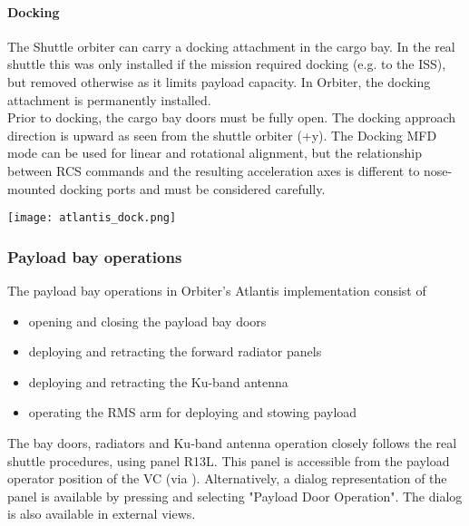 \documentclass[Orbiter User Manual.tex]{subfiles}
\begin{document}
\paragraph{Docking}
The Shuttle orbiter can carry a docking attachment in the cargo bay. In the real shuttle this was only installed if the mission required docking (e.g. to the ISS), but removed otherwise as it limits payload capacity. In Orbiter, the docking attachment is permanently installed.\\

Prior to docking, the cargo bay doors must be fully open. The docking approach direction is upward as seen from the shuttle orbiter (+y). The Docking MFD mode can be used for linear and rotational alignment, but the relationship between RCS commands and the resulting acceleration axes is different to nose-mounted docking ports and must be considered carefully.

\begin{center}
\texttt{[image: atlantis\_dock.png]}
\end{center}

\subsubsection{Payload bay operations}

The payload bay operations in Orbiter's Atlantis implementation consist of
\begin{itemize}
\item opening and closing the payload bay doors
\item deploying and retracting the forward radiator panels
\item deploying and retracting the Ku-band antenna
\item operating the RMS arm for deploying and stowing payload
\end{itemize}

\noindent
The bay doors, radiators and Ku-band antenna operation closely follows the real shuttle procedures, using panel R13L. This panel is accessible from the payload operator position of the VC (via \keystroke{$\leftarrow$}). Alternatively, a dialog representation of the panel is available by pressing  and selecting "Payload Door Operation". The dialog is also available in external views.
\end{document}
